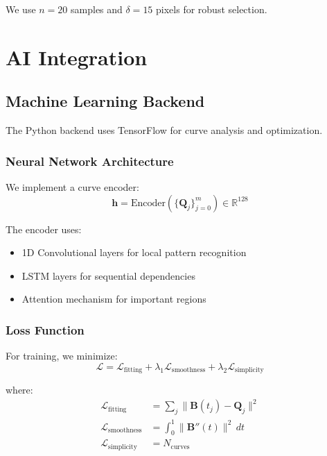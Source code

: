 \documentclass[12pt,a4paper]{article}
\begin{document}
We use $n=20$ samples and $\delta=15$ pixels for robust selection.

\section{AI Integration}

\subsection{Machine Learning Backend}

The Python backend uses TensorFlow for curve analysis and optimization.

\subsubsection{Neural Network Architecture}

We implement a curve encoder:
\begin{equation}
\mathbf{h} = \text{Encoder}(\{\mathbf{Q}_j\}_{j=0}^{m}) \in \mathbb{R}^{128}
\end{equation}

The encoder uses:
\begin{itemize}
    \item 1D Convolutional layers for local pattern recognition
    \item LSTM layers for sequential dependencies
    \item Attention mechanism for important regions
\end{itemize}

\subsubsection{Loss Function}

For training, we minimize:
\begin{equation}
\mathcal{L} = \mathcal{L}_{\text{fitting}} + \lambda_1 \mathcal{L}_{\text{smoothness}} + \lambda_2 \mathcal{L}_{\text{simplicity}}
\end{equation}

where:
\begin{align}
\mathcal{L}_{\text{fitting}} &= \sum_{j}\|\mathbf{B}(t_j) - \mathbf{Q}_j\|^2 \\
\mathcal{L}_{\text{smoothness}} &= \int_0^1 \|\mathbf{B}''(t)\|^2 \, dt \\
\mathcal{L}_{\text{simplicity}} &= N_{\text{curves}}
\end{align}
\end{document}
